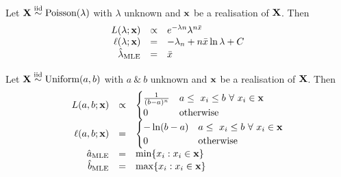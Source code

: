 \documentclass[11pt,a4paper]{article}
\begin{document}
Let $\textbf{X}\overset{\text{iid}}{\sim}\text{Poisson}(\lambda)$ with $\lambda$ unknown and $\textbf{x}$ be a realisation of $\textbf{X}$. Then
\[\begin{array}{rcl}
L(\lambda;\textbf{x})&\propto&e^{-\lambda n}\lambda^{n\bar{x}}\\
\ell(\lambda;\textbf{x})&=&-\lambda_n+n\bar{x}\ln\lambda+C\\
\hat\lambda_\text{MLE}&=&\bar{x}
\end{array}\]

Let $\textbf{X}\overset{\text{iid}}{\sim}\text{Uniform}(a,b)$ with $a\ \&\ b$ unknown and $\textbf{x}$ be a realisation of $\textbf{X}$. Then
\[\begin{array}{rcl}
L(a,b;\x)&\propto&\begin{cases}\frac{1}{(b-a)^n}&a\leq\ x_i\leq b\ \forall\ x_i\in\x\\0&\text{otherwise}\end{cases}\\
\ell(a,b;\x)&=&\begin{cases}-\ln(b-a)&a\leq\ x_i\leq b\ \forall\ x_i\in\x\\0&\text{otherwise}\end{cases}\\
\hat{a}_\text{MLE}&=&\min\{x_i:x_i\in\x\}\\
\hat{b}_\text{MLE}&=&\max\{x_i:x_i\in\x\}
\end{array}\]
\end{document}
